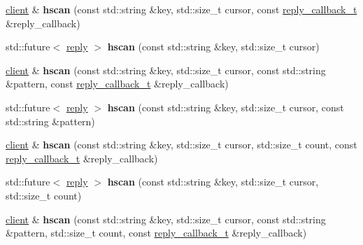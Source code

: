 \begin{DoxyCompactItemize}
\hyperlink{classcpp__redis_1_1client}{client} \& {\bfseries hscan} (const std\+::string \&key, std\+::size\+\_\+t cursor, const \hyperlink{classcpp__redis_1_1client_a061a1140d36d2eaeda82b09a0bb3f9f2}{reply\+\_\+callback\+\_\+t} \&reply\+\_\+callback)
\item 
\mbox{\label{classcpp__redis_1_1client_ab5d944206bf5be886be130ab5e341219}} 
std\+::future$<$ \hyperlink{classcpp__redis_1_1reply}{reply} $>$ {\bfseries hscan} (const std\+::string \&key, std\+::size\+\_\+t cursor)
\item 
\mbox{\label{classcpp__redis_1_1client_a493ce9060e1cd4424d892ade5aab4513}} 
\hyperlink{classcpp__redis_1_1client}{client} \& {\bfseries hscan} (const std\+::string \&key, std\+::size\+\_\+t cursor, const std\+::string \&pattern, const \hyperlink{classcpp__redis_1_1client_a061a1140d36d2eaeda82b09a0bb3f9f2}{reply\+\_\+callback\+\_\+t} \&reply\+\_\+callback)
\item 
\mbox{\label{classcpp__redis_1_1client_a0eea61815c7fb9b0bd2477ba8d6746eb}} 
std\+::future$<$ \hyperlink{classcpp__redis_1_1reply}{reply} $>$ {\bfseries hscan} (const std\+::string \&key, std\+::size\+\_\+t cursor, const std\+::string \&pattern)
\item 
\mbox{\label{classcpp__redis_1_1client_a98a4dc7506680b33cf3eb9ce8a8b6b15}} 
\hyperlink{classcpp__redis_1_1client}{client} \& {\bfseries hscan} (const std\+::string \&key, std\+::size\+\_\+t cursor, std\+::size\+\_\+t count, const \hyperlink{classcpp__redis_1_1client_a061a1140d36d2eaeda82b09a0bb3f9f2}{reply\+\_\+callback\+\_\+t} \&reply\+\_\+callback)
\item 
\mbox{\label{classcpp__redis_1_1client_acad881c681f9ca774ee337c30b4bafed}} 
std\+::future$<$ \hyperlink{classcpp__redis_1_1reply}{reply} $>$ {\bfseries hscan} (const std\+::string \&key, std\+::size\+\_\+t cursor, std\+::size\+\_\+t count)
\item 
\mbox{\label{classcpp__redis_1_1client_aca43b4d4f54076aa0b0a9a3c14863e7c}} 
\hyperlink{classcpp__redis_1_1client}{client} \& {\bfseries hscan} (const std\+::string \&key, std\+::size\+\_\+t cursor, const std\+::string \&pattern, std\+::size\+\_\+t count, const \hyperlink{classcpp__redis_1_1client_a061a1140d36d2eaeda82b09a0bb3f9f2}{reply\+\_\+callback\+\_\+t} \&reply\+\_\+callback)

\end{DoxyCompactItemize}
